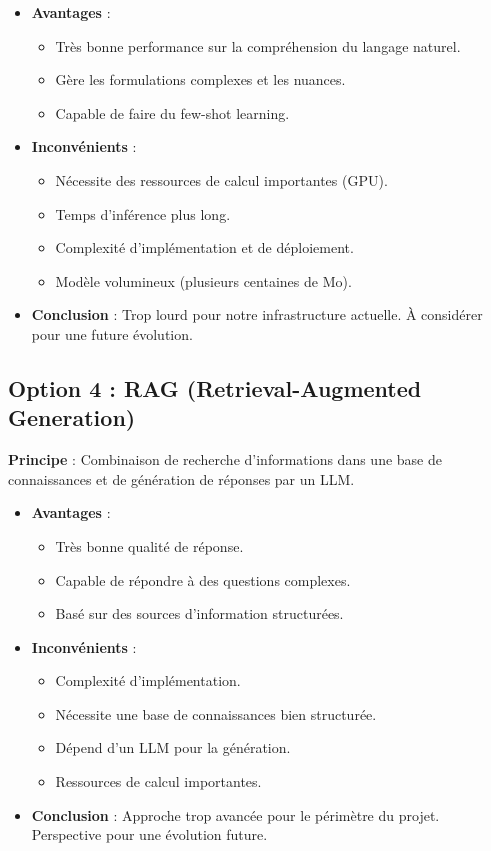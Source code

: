 \begin{itemize}
    \item \textbf{Avantages} :
        \begin{itemize}
            \item Très bonne performance sur la compréhension du langage naturel.
            \item Gère les formulations complexes et les nuances.
            \item Capable de faire du few-shot learning.
        \end{itemize}
    \item \textbf{Inconvénients} :
        \begin{itemize}
            \item Nécessite des ressources de calcul importantes (GPU).
            \item Temps d'inférence plus long.
            \item Complexité d'implémentation et de déploiement.
            \item Modèle volumineux (plusieurs centaines de Mo).
        \end{itemize}
    \item \textbf{Conclusion} : Trop lourd pour notre infrastructure actuelle. À considérer pour une future évolution.
\end{itemize}

\subsection{Option 4 : RAG (Retrieval-Augmented Generation)}
\label{subsec:nlp-rag}

\textbf{Principe} : Combinaison de recherche d'informations dans une base de connaissances et de génération de réponses par un LLM.

\begin{itemize}
    \item \textbf{Avantages} :
        \begin{itemize}
            \item Très bonne qualité de réponse.
            \item Capable de répondre à des questions complexes.
            \item Basé sur des sources d'information structurées.
        \end{itemize}
    \item \textbf{Inconvénients} :
        \begin{itemize}
            \item Complexité d'implémentation.
            \item Nécessite une base de connaissances bien structurée.
            \item Dépend d'un LLM pour la génération.
            \item Ressources de calcul importantes.
        \end{itemize}
    \item \textbf{Conclusion} : Approche trop avancée pour le périmètre du projet. Perspective pour une évolution future.
\end{itemize}

